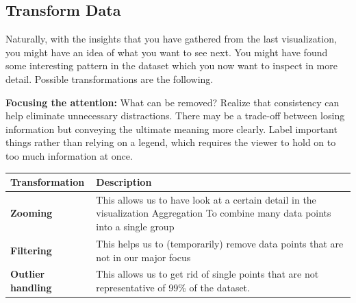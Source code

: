 \documentclass[]{book}
\begin{document}
\hypertarget{transform-data}{%
\subsection{Transform Data}\label{transform-data}}

Naturally, with the insights that you have gathered from the last visualization, you might have an idea of what you want to see next. You might have found some interesting pattern in the dataset which you now want to inspect in more detail. Possible transformations are the following.

\textbf{Focusing the attention:}
What can be removed? Realize that consistency can help eliminate unnecessary distractions. There may be a trade-off between losing information but conveying the ultimate meaning more clearly. Label important things rather than relying on a legend, which requires the viewer to hold on to too much information at once.

\begin{longtable}[]{@{}ll@{}}
\toprule
\begin{minipage}[b]{0.15\columnwidth}\raggedright
\textbf{Transformation}\strut
\end{minipage} & \begin{minipage}[b]{0.79\columnwidth}\raggedright
\textbf{Description}\strut
\end{minipage}\tabularnewline
\midrule
\endhead
\begin{minipage}[t]{0.15\columnwidth}\raggedright
\textbf{Zooming}\strut
\end{minipage} & \begin{minipage}[t]{0.79\columnwidth}\raggedright
This allows us to have look at a certain detail in the visualization Aggregation To combine many data points into a single group\strut
\end{minipage}\tabularnewline
\begin{minipage}[t]{0.15\columnwidth}\raggedright
\textbf{Filtering}\strut
\end{minipage} & \begin{minipage}[t]{0.79\columnwidth}\raggedright
This helps us to (temporarily) remove data points that are not in our major focus\strut
\end{minipage}\tabularnewline
\begin{minipage}[t]{0.15\columnwidth}\raggedright
\textbf{Outlier handling}\strut
\end{minipage} & \begin{minipage}[t]{0.79\columnwidth}\raggedright
This allows us to get rid of single points that are not representative of 99\% of the dataset.\strut
\end{minipage}\tabularnewline
\bottomrule
\end{longtable}
\end{document}
